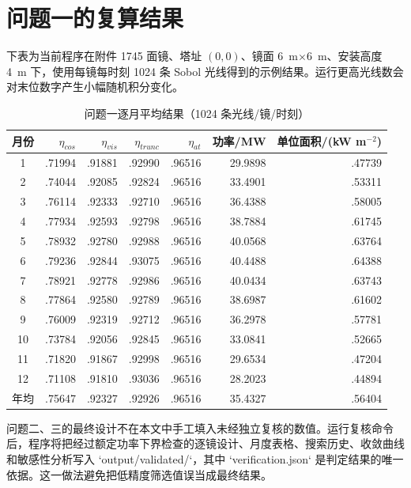 \documentclass[UTF8,a4paper,11pt]{ctexart}
\begin{document}
\section{问题一的复算结果}
下表为当前程序在附件 1745 面镜、塔址 $(0,0)$、镜面 \SI{6}{m}$\times$\SI{6}{m}、安装高度 \SI{4}{m} 下，使用每镜每时刻 1024 条 Sobol 光线得到的示例结果。运行更高光线数会对末位数字产生小幅随机积分变化。

\begin{table}[H]
\centering
\caption{问题一逐月平均结果（1024 条光线/镜/时刻）}
\begin{tabular}{crrrrrr}
\toprule
月份 & $\eta_{cos}$ & $\eta_{vis}$ & $\eta_{trunc}$ & $\eta_{at}$ & 功率/MW & 单位面积/(kW m$^{-2}$)\\
\midrule
1 & .71994 & .91881 & .92990 & .96516 & 29.9898 & .47739\\
2 & .74044 & .92085 & .92824 & .96516 & 33.4901 & .53311\\
3 & .76114 & .92333 & .92710 & .96516 & 36.4388 & .58005\\
4 & .77934 & .92593 & .92798 & .96516 & 38.7884 & .61745\\
5 & .78932 & .92780 & .92988 & .96516 & 40.0568 & .63764\\
6 & .79236 & .92844 & .93075 & .96516 & 40.4488 & .64388\\
7 & .78921 & .92778 & .92986 & .96516 & 40.0434 & .63743\\
8 & .77864 & .92580 & .92789 & .96516 & 38.6987 & .61602\\
9 & .76009 & .92319 & .92712 & .96516 & 36.2978 & .57781\\
10 & .73784 & .92056 & .92845 & .96516 & 33.0841 & .52665\\
11 & .71820 & .91867 & .92998 & .96516 & 29.6534 & .47204\\
12 & .71108 & .91810 & .93036 & .96516 & 28.2023 & .44894\\
\midrule
年均 & .75647 & .92327 & .92926 & .96516 & 35.4327 & .56404\\
\bottomrule
\end{tabular}
\end{table}

问题二、三的最终设计不在本文中手工填入未经独立复核的数值。运行复核命令后，程序将把经过额定功率下界检查的逐镜设计、月度表格、搜索历史、收敛曲线和敏感性分析写入 `output/validated/`，其中 `verification.json` 是判定结果的唯一依据。这一做法避免把低精度筛选值误当成最终结果。
\end{document}
